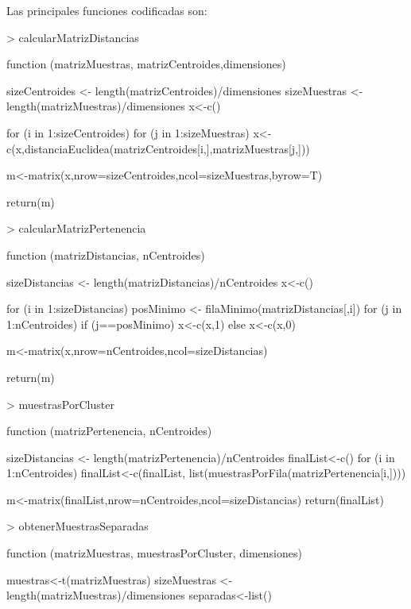 \documentclass [a4paper] {article}
\begin{document}
\bigskip
Las principales funciones codificadas son:
\begin{Schunk}
\begin{Sinput}
> calcularMatrizDistancias
\end{Sinput}
\begin{Soutput}
function (matrizMuestras, matrizCentroides,dimensiones) {
    sizeCentroides <- length(matrizCentroides)/dimensiones
    sizeMuestras <- length(matrizMuestras)/dimensiones
    x<-c()

    for (i in 1:sizeCentroides) {
        for (j in 1:sizeMuestras)
            x<-c(x,distanciaEuclidea(matrizCentroides[i,],matrizMuestras[j,]))
    }

    m<-matrix(x,nrow=sizeCentroides,ncol=sizeMuestras,byrow=T)

    return(m)
}
\end{Soutput}
\begin{Sinput}
> calcularMatrizPertenencia
\end{Sinput}
\begin{Soutput}
function (matrizDistancias, nCentroides) {
    sizeDistancias <- length(matrizDistancias)/nCentroides
    x<-c()

    for (i in 1:sizeDistancias) {
        posMinimo <- filaMinimo(matrizDistancias[,i])
        for (j in 1:nCentroides)
            if (j==posMinimo){
                x<-c(x,1)
            } else {
                x<-c(x,0)
            }
    }

    m<-matrix(x,nrow=nCentroides,ncol=sizeDistancias)

    return(m)
}
\end{Soutput}
\begin{Sinput}
> muestrasPorCluster
\end{Sinput}
\begin{Soutput}
function (matrizPertenencia, nCentroides) {
    sizeDistancias <- length(matrizPertenencia)/nCentroides
    finalList<-c()
    for (i in 1:nCentroides){
        finalList<-c(finalList, list(muestrasPorFila(matrizPertenencia[i,])))
    }
    
    m<-matrix(finalList,nrow=nCentroides,ncol=sizeDistancias)
    return(finalList)
}
\end{Soutput}
\begin{Sinput}
> obtenerMuestrasSeparadas
\end{Sinput}
\begin{Soutput}
function (matrizMuestras, muestrasPorCluster, dimensiones) {
    muestras<-t(matrizMuestras)
    sizeMuestras <- length(matrizMuestras)/dimensiones
    separadas<-list()

}
\end{Soutput}
\end{Schunk}
\end{document}
